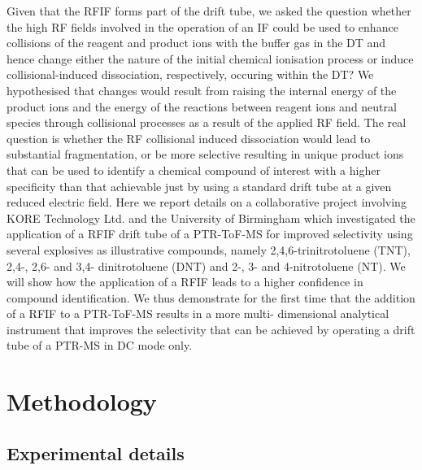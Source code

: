 Given that the RFIF forms part of the drift tube, we asked the question whether the high RF fields involved in the operation of an IF could be used to enhance collisions of the reagent and product ions with the buffer gas in the DT and hence change either the nature of the initial chemical ionisation process or induce collisional-induced dissociation, respectively, occuring within the DT? We hypothesised that changes would result from raising the internal energy of the product ions and the energy of the reactions between reagent ions and neutral species through collisional processes as a result of the applied RF field. The real question is whether the RF collisional induced dissociation would lead to substantial fragmentation, or be more selective resulting in unique product ions that can be used to identify a chemical compound of interest with a higher specificity than that achievable just by using a standard drift tube at a given reduced electric field. Here we report details on a collaborative project involving KORE Technology Ltd. and the University of Birmingham which investigated the application of a RFIF drift tube of a PTR-ToF-MS for improved selectivity using several explosives as illustrative compounds, namely 2,4,6-trinitrotoluene (TNT), 2,4-, 2,6- and 3,4- dinitrotoluene (DNT) and 2-, 3- and 4-nitrotoluene (NT). We will show how the application of a RFIF leads to a higher confidence in compound identification. We thus demonstrate for the first time that the addition of a RFIF to a PTR-ToF-MS results in a more multi- dimensional analytical instrument that improves the selectivity that can be achieved by operating a drift tube of a PTR-MS in DC mode only.





\section{Methodology}

\subsection{Experimental details}

